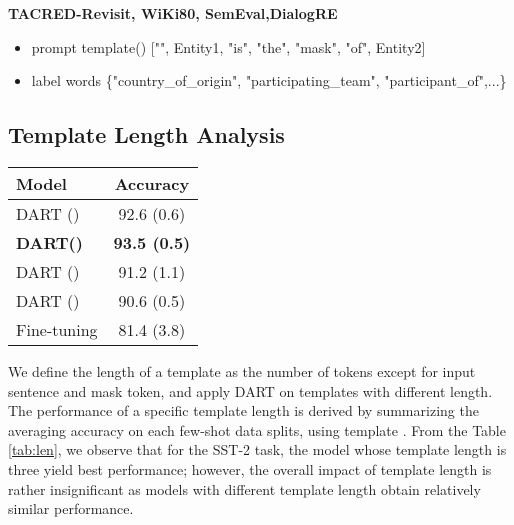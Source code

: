 \documentclass{article} \usepackage{iclr2022_conference,times}
\begin{document}
\textbf{TACRED-Revisit, WiKi80, SemEval,DialogRE}
\begin{itemize}
\item prompt template()
["", Entity1, "is", "the", "mask", "of", Entity2]
\item label words
\{"country\_of\_origin", "participating\_team", "participant\_of",...\}
\end{itemize}
 {
 \color{highlight}
 
 
 


 
 
 
 
\subsection{Template Length Analysis}


\begin{table*}[h]
\begin{center}
\centering
\begin{tabular}{l  c}
\toprule
\textbf{Model}  & \textbf{Accuracy} \\

\midrule
DART () &  92.6 (0.6) \\
\textbf{DART()} &  \textbf{93.5 (0.5)} \\
DART ()  & 91.2 (1.1) \\
DART () & 90.6 (0.5) \\
Fine-tuning &  81.4 (3.8) \\
\bottomrule
\end{tabular}
\end{center}
\caption{Few-shot performance on SST-2 task using templates with different length.
}
\vspace{-15pt}
    \label{tab:len}
\end{table*}

We define the length of a template as the number of tokens except for input sentence and mask token, and apply DART on templates with different length. 
The performance of a specific template length  is derived by summarizing the averaging accuracy on each few-shot data splits, using template . 
From the Table \ref{tab:len}, we observe that for the SST-2 task, the model whose template length is three yield best performance; however, the overall impact of template length is rather insignificant as models with different template length obtain relatively similar performance.













}
\end{document}
